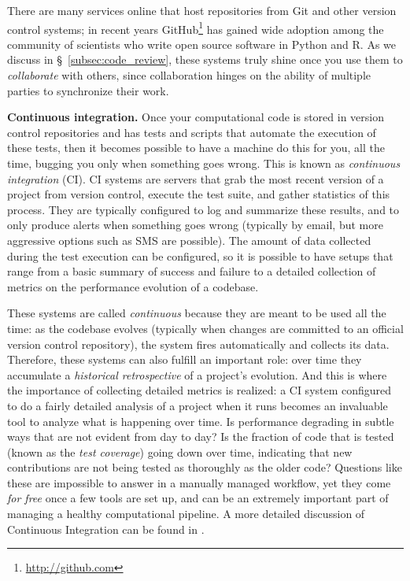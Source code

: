 \documentclass[11pt,oneside,english]{article}
\newcommand{\blockpar}[1]{\vspace*{3mm} \noindent \textbf{#1}}
\begin{document}
There are many services online that host repositories from Git and other
version control systems; in recent years
GitHub\footnote{\url{http://github.com}} has gained wide adoption among
the community of scientists who write open source software in Python and R.  As
we discuss in §~\ref{subsec:code_review}, these systems truly shine once you
use them to \emph{collaborate} with others, since collaboration hinges on the
ability of multiple parties to synchronize their work.

\blockpar{Continuous integration.} Once your computational code is stored in
version control repositories and has tests and scripts that automate the
execution of these tests, then it becomes possible to have a machine do this
for you, all the time, bugging you only when something goes wrong.  This is
known as \emph{continuous integration} (CI). CI systems are servers that grab
the most recent version of a project from version control, execute the test
suite, and gather statistics of this process.  They are typically configured to
log and summarize these results, and to only produce alerts when something goes
wrong (typically by email, but more aggressive options such as SMS are
possible).  The amount of data collected during the test execution can be
configured, so it is possible to have setups that range from a basic summary of
success and failure to a detailed collection of metrics on the performance
evolution of a codebase.

These systems are called \emph{continuous} because they are meant to be used
all the time: as the codebase evolves (typically when changes are committed to
an official version control repository), the system fires automatically and
collects its data.  Therefore, these systems can also fulfill an important
role: over time they accumulate a \emph{historical retrospective} of a
project's evolution.  And this is where the importance of collecting detailed
metrics is realized: a CI system configured to do a fairly detailed analysis of
a project when it runs becomes an invaluable tool to analyze what is happening
over time.  Is performance degrading in subtle ways that are not evident
from day to day? Is the fraction of code that is tested (known as the
\emph{test coverage}) going down over time, indicating that new contributions
are not being tested as thoroughly as the older code?  Questions like these are
impossible to answer in a manually managed workflow, yet they come \emph{for
free} once a few tools are set up, and can be an extremely important part of
managing a healthy computational pipeline.  A more detailed discussion of
Continuous Integration can be found in \cite{br-ck:2011}.
\end{document}
